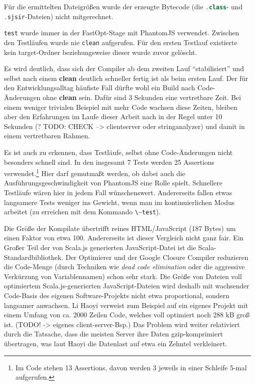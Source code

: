 \documentclass[a4paper, 12pt, hidelinks, listof=totoc, listoftables=totoc, bibliography=totoc]{scrreprt}
\newcommand{\code}[1]{\lstinline[language=Scala, style=inline]|#1|}
\begin{document}
\medskip

Für die ermittelten Dateigrößen wurde der erzeugte Bytecode (die \code{.class}- und \code{.sjsir}-Dateien) nicht mitgerechnet.

\code{test} wurde immer in der FastOpt-Stage mit PhantomJS verwendet. Zwischen den Testläufen wurde nie \code{clean} aufgerufen. Für den ersten Testlauf existierte kein target-Ordner beziehungsweise dieser wurde zuvor gelöscht.

Es wird deutlich, dass sich der Compiler ab dem zweiten Lauf "`stabilisiert"' und selbst nach einem \textbf{clean} deutlich schneller fertig ist als beim ersten Lauf. Der für den Entwicklungsalltag häufiste Fall dürfte wohl ein Build nach Code-Änderungen ohne \textbf{clean} sein. Dafür sind 3 Sekunden eine vertretbare Zeit. Bei einem weniger trivialen Beispiel mit mehr Code wachsen diese Zeiten, bleiben aber den Erfahrungen im Laufe dieser Arbeit nach in der Regel unter 10 Sekunden (? TODO: CHECK --> clientserver oder stringanalyzer) und damit in einem vertretbaren Rahmen.

Es ist auch zu erkennen, dass Testläufe, selbst ohne Code-Änderungen nicht besonders schnell sind. In den insgesamt 7 Tests werden 25 Assertions verwendet.\footnote{Im Code stehen 13 Assertions, davon werden 3 jeweils in einer Schleife 5-mal aufgerufen.} Hier darf gemutmaßt werden, ob dabei auch die Ausführungsgeschwindigkeit von PhantomJS eine Rolle spielt. Schnellere Testläufe wären hier in jedem Fall wünschenswert. Andererseits fallen etwas langsamere Tests weniger ins Gewicht, wenn man im kontinuierlichen Modus arbeitet (zu erreichen mit dem Kommando \code{\~test}).

Die Größe der Kompilate übertrifft reines HTML/JavaScript (187 Bytes) um einen Faktor von etwa 100. Andererseits ist dieser Vergleich nicht ganz fair. Ein Großer Teil der von Scala.js generierten JavaScript-Datei ist die Scala-Standardbibliothek.
Der Optimierer und der Google Closure Compiler reduzieren die Code-Menge (durch Techniken wie \textit{dead code elimination} oder die aggressive Verkürzung von Variablennamen) schon sehr stark. Die Größe von Dateien voll optimiertem Scala.js-generierten JavaScript-Dateien wird deshalb mit wachsender Code-Basis des eigenen Software-Projekts nicht etwa proportional, sondern langsamer anwachsen. Li Haoyi verweist zum Beispiel auf ein eigenes Projekt mit einem Umfang von ca. 2000 Zeilen Code, welches voll optimiert noch 288 kB groß ist. (TODO! -> eigenes client-server-Bsp.) Das Problem wird weiter relativiert durch die Tatsache, dass die meisten Server ihre Daten gzip-komprimiert übertragen, was laut Haoyi die Datenlast auf etwa ein Zehntel verkleinert.\cite[\#BlobSize]{haoyi.HOS}
\end{document}
